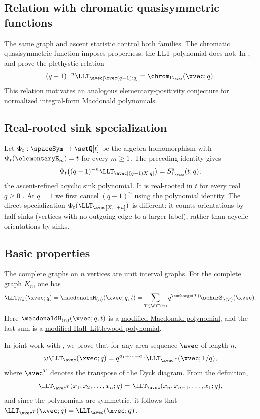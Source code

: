 \subsection[unicellularLLTChromaticRelation]{Relation with chromatic quasisymmetric functions}

The same graph and ascent statistic control both families.  The chromatic
quasisymmetric function imposes properness; the LLT polynomial does not.  In
\cite{CarlssonMellit2017},  and  prove
the plethystic relation
\[
(q-1)^{-n}\LLT_\avec[\xvec(q-1);q]
=
\chrom_{\Gamma_\avec}(\xvec;q).
\]
This relation motivates an analogous
\hyperref[macdonaldJElementaryPositivity]{elementary-positivity conjecture
for normalized integral-form Macdonald polynomials}.

\subsection[unicellularLLTSinkSpecialization]{Real-rooted sink specialization}

Let $\Phi_t:\spaceSym\to\setQ[t]$ be the algebra homomorphism with
$\Phi_t(\elementaryE_m)=t$ for every $m\geq1$. The preceding identity gives
\[
 \Phi_t\!\left((q-1)^{-n}\LLT_\avec[(q-1)X;q]\right)
 =S^a_{\Gamma_\avec}(t;q),
\]
the \hyperref[chromaticSinkRealRooted]{ascent-refined acyclic sink polynomial}.
It is real-rooted in $t$ for every real $q\geq0$
\cite[Thm.~5.2 and Sec.~5.4]{AlexanderssonLeite2026x}.
At $q=1$ we first cancel $(q-1)^n$ using the polynomial identity.
The direct specialization $\Phi_t(\LLT_\avec[X;1+u])$ is different:
it counts orientations by half-sinks (vertices with no outgoing edge
to a larger label), rather than acyclic orientations by sinks.

\subsection[unicellularLLTProperties]{Basic properties}

The complete graphs on $n$ vertices are
\hyperref[unitIntervalGraph]{unit interval graphs}.  For the complete graph
$K_n$, one has
\[
\LLT_{K_n}(\xvec;q)
=
\macdonaldH_{(n)}(\xvec;q,t)
=
\sum_{T\in\SYT(n)}q^{\cocharge(T)}\schurS_{\lambda(T)}(\xvec).
\]
Here $\macdonaldH_{(n)}(\xvec;q,t)$ is a
\hyperref[macdonaldH]{modified Macdonald polynomial}, and the last sum is a
\hyperref[hallLittlewoodH]{modified Hall--Littlewood polynomial}.

In joint work with , we prove that for any area sequence
$\avec$ of length $n$,
\[
\omega \LLT_{\avec}(\xvec;q)
=
q^{a_1+\dotsb+a_n}\LLT_{\avec^T}(\xvec;1/q),
\]
where $\avec^T$ denotes the transpose of the Dyck diagram.  From the definition,
\[
\LLT_{\avec^T}(x_1,x_2,\dotsc,x_n;q)
=
\LLT_{\avec}(x_n,x_{n-1},\dotsc,x_1;q),
\]
and since the polynomials are symmetric, it follows that
$\LLT_{\avec^T}(\xvec;q)=\LLT_{\avec}(\xvec;q)$.

